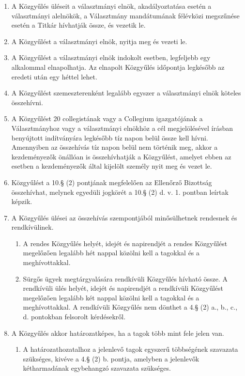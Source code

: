 \documentclass{../styles/rulebook}
\begin{document}
\begin{enumerate}
	\item A Közgyűlés üléseit a választmányi elnök, akadályoztatása esetén a választmányi alelnökök, a Választmány mandátumának félévközi megszűnése esetén a Titkár hívhatják össze, és vezetik le.
	\item A Közgyűlést a választmányi elnök, nyitja meg és vezeti le.
	\item A Közgyűlést a választmányi elnök indokolt esetben, legfeljebb egy alkalommal elnapolhatja. Az elnapolt Közgyűlés időpontja legkésőbb az eredeti után egy héttel lehet.
	\item A Közgyűlést szemeszterenként legalább egyszer a választmányi elnök köteles összehívni.
	\item A Közgyűlést 20 collegistának vagy a Collegium igazgatójának a Választmányhoz vagy a választmányi elnökhöz a cél megjelölésével írásban benyújtott indítványára legkésőbb tíz napon belül össze kell hívni. Amennyiben az összehívás tíz napon belül nem történik meg, akkor a kezdeményezők önállóan is összehívhatják a Közgyűlést, amelyet ebben az esetben a kezdeményezők által kijelölt személy nyit meg és vezet le.
	\item Közgyűlést a 10.§ (2) pontjának megfelelően az Ellenőrző Bizottság összehívhat, melynek egyedüli jogkörét a 10.§ (2) d. v. 1. pontban leírtak képzik.
	\item A Közgyűlés ülései az összehívás szempontjából minősülhetnek rendesnek és rendkívülinek.
	\begin{enumerate}
		\item A rendes Közgyűlés helyét, idejét és napirendjét a rendes Közgyűlést megelőzően legalább hét nappal közölni kell a tagokkal és a meghívottakkal.
		\item Sürgős ügyek megtárgyalására rendkívüli Közgyűlés hívható össze. A rendkívüli ülés helyét, idejét és napirendjét a rendkívüli Közgyűlést megelőzően legalább két nappal közölni kell a tagokkal és a meghívottakkal. A rendkívüli Közgyűlés nem dönthet a 4.§ (2) a., b., c., d. pontokban felsorolt kérdésekről.
	\end{enumerate}
	\item A Közgyűlés akkor határozatképes, ha a tagok több mint fele jelen van.
	\begin{enumerate}
		\item A határozathozatalhoz a jelenlevő tagok egyszerű többségének szavazata szükséges, kivéve a 4.§ (2) b. pontja, amelyben a jelenlevők kétharmadának egybehangzó szavazata szükséges.

\end{enumerate}
\end{enumerate}
\end{document}
